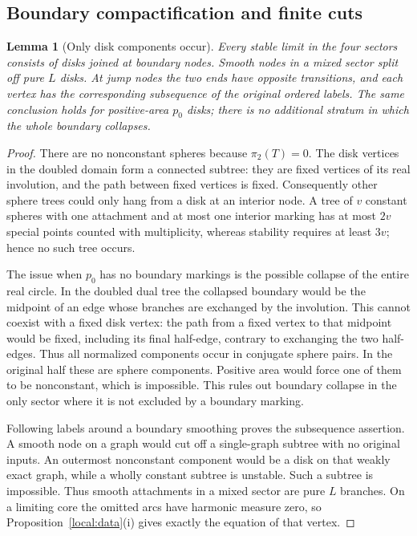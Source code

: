 \documentclass[11pt]{article}
\newtheorem{lemma}[theorem]{Lemma}
\theoremstyle{definition}
\theoremstyle{remark}
\numberwithin{equation}{section}
\begin{document}
\subsection{Boundary compactification and finite cuts}

\begin{lemma}[Only disk components occur]\label{local:disk-trees}
Every stable limit in the four sectors consists of disks joined at
boundary nodes.  Smooth nodes in a mixed sector split off pure $L$
disks.  At jump nodes the two ends have opposite transitions, and each
vertex has the corresponding subsequence of the original ordered
labels.  The same conclusion holds for positive-area $p_0$ disks;
there is no additional stratum in which the whole boundary collapses.
\end{lemma}
\begin{proof}
There are no nonconstant spheres because $\pi_2(T)=0$.  The disk vertices
in the doubled domain form a connected subtree: they are fixed vertices
of its real involution, and the path between fixed vertices is fixed.
Consequently other sphere trees could only hang from a disk at an
interior node.  A tree of $v$ constant spheres with one attachment and
at most one interior marking has at most $2v$ special points counted
with multiplicity, whereas stability requires at least $3v$; hence no
such tree occurs.

The issue when $p_0$ has no boundary markings is the possible collapse
of the entire real circle.  In the doubled dual tree the collapsed
boundary would be the midpoint of an edge whose branches are exchanged
by the involution.  This cannot coexist with a fixed disk vertex:
the path from a fixed vertex to that midpoint would be fixed, including
its final half-edge, contrary to exchanging the two half-edges.  Thus
all normalized components occur in conjugate sphere pairs.  In the
original half these are sphere components.  Positive area would force
one of them to be nonconstant, which is impossible.  This rules out
boundary collapse in the only sector where it is not excluded by a
boundary marking.

Following labels around a boundary smoothing proves the subsequence
assertion.  A smooth node on a graph would cut off a single-graph
subtree with no original inputs.  An outermost nonconstant component
would be a disk on that weakly exact graph, while a wholly constant
subtree is unstable.  Such a subtree is impossible.  Thus smooth
attachments in a mixed sector are pure $L$ branches.  On a limiting
core the omitted arcs have harmonic measure zero, so
Proposition~\ref{local:data}(i) gives exactly the equation of that vertex.
\end{proof}
\end{document}
